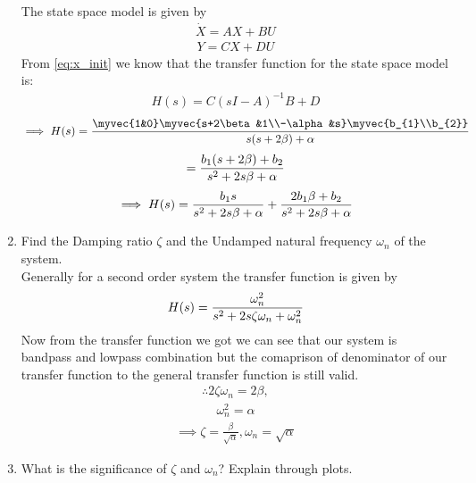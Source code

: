 \begin{enumerate}[label=\thesubsection.\arabic*.,ref=\thesubsection.\theenumi]
\solution The state space model is given by
\begin{align}
\dot{X} = AX + BU
\end{align}
\begin{align}
Y = CX + DU
\end{align}
%
From \eqref{eq:x_init} we know that the transfer function for the state space model is:
\begin{align}
H(s) = C(sI - A)^{-1}B + D
\end{align}
\begin{align}
\implies H(s) = \frac
{
\myvec{1&0}\myvec{s+2\beta&1\\-\alpha&s}\myvec{b_{1}\\b_{2}}
}
{
s(s+2\beta) + \alpha
}
\end{align}
\begin{align}
= \LARGE{\frac{b_{1}(s+2\beta) + b_{2}}{s^{2}+2s\beta+\alpha}}
\end{align}
\begin{align}
   \implies H(s) = \LARGE{\frac{b_{1}s}{s^{2}+2s\beta+\alpha}} + \LARGE{\frac{2b_{1}\beta + b_{2}}{s^{2}+2s\beta+\alpha}}
\end{align}
%
\item Find the Damping ratio $\zeta$ and the Undamped natural frequency $\omega_{n}$ of the system.
\\
\solution
Generally for a second order system the transfer function is given by
\begin{align}
H(s) = \LARGE{\frac{\omega_{n}^2}{s^{2}+2s\zeta\omega_{n}+\omega_{n}^2}}
\end{align}
Now from the transfer function we got we can see that our system is bandpass and lowpass combination but the comaprison of denominator of our transfer function to the general transfer function is still valid.
\begin{align}
\therefore 2\zeta\omega_{n} = 2\beta,
\end{align}
\begin{align}
\omega_{n}^2 = \alpha
\end{align}
\begin{align}
\implies \zeta = \frac{\beta}{\sqrt{\alpha}} , \omega_{n} = \sqrt{\alpha}
\end{align}
\item What is the significance of $\zeta$ and  $\omega_{n}$? Explain through plots.

\end{enumerate}
